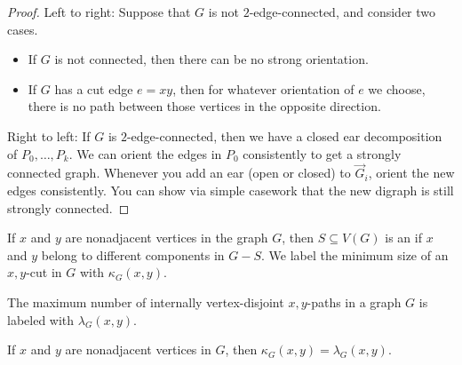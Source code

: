 \begin{proof}
  Left to right:
  Suppose that $G$ is not $2$-edge-connected, and consider two cases.
  \begin{itemize}
  \item If $G$ is not connected, then there can be no strong orientation.
  \item If $G$ has a cut edge $e = xy$, then for whatever orientation of $e$ we
	choose, there is no path between those vertices in the opposite direction.
  \end{itemize}

  Right to left:
  If $G$ is $2$-edge-connected, then we have a closed ear decomposition of $P_0,
  \ldots, P_k$.
  We can orient the edges in $P_0$ consistently to get a strongly connected
  graph.
  Whenever you add an ear (open or closed) to $\vec{G}_i$, orient the new edges
  consistently.
  You can show via simple casework that the new digraph is still strongly
  connected.
\end{proof}



\begin{definition}
  If $x$ and $y$ are nonadjacent vertices in the graph $G$, then $S \subseteq
  V(G)$ is an  if $x$ and $y$ belong to different components in
  $G - S$.
  We label the minimum size of an $x,y$-cut in $G$ with $\kappa_G(x,y)$.
\end{definition}

\begin{definition}
  The maximum number of internally vertex-disjoint $x,y$-paths in a graph $G$ is
  labeled with $\lambda_G(x,y)$.
\end{definition}

\begin{theorem}
  If $x$ and $y$ are nonadjacent vertices in $G$, then $\kappa_G(x,y) =
  \lambda_G(x,y)$.
\end{theorem}

